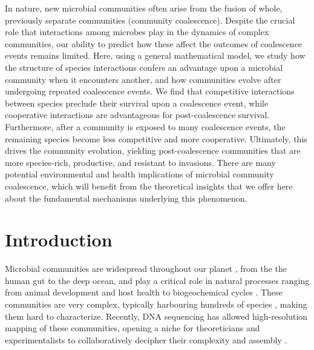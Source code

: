 \documentclass[10pt,letterpaper]{article}
\begin{document}
In nature, new microbial communities often arise from the fusion of whole, previously separate communities (community coalescence). Despite the crucial role that interactions among microbes play in the dynamics of complex communities, our ability to predict how these affect the outcomes of coalescence events remains limited. Here, using a general mathematical model, we study how the structure of species interactions confers an advantage upon a microbial community when it encounters another, and how communities evolve after undergoing repeated coalescence events. We find that competitive interactions between species preclude their survival upon a coalescence event, while cooperative interactions are advantageous for post-coalescence survival. Furthermore, after a community is exposed to many coalescence events, the remaining species become less competitive and more cooperative. Ultimately, this drives the community evolution, yielding post-coalescence communities that are more species-rich, productive, and resistant to invasions. There are many potential environmental and health implications of microbial community coalescence, which will benefit from the theoretical insights that we offer here about the fundamental mechanisms underlying this phenomenon.

\linenumbers

\section*{Introduction}

Microbial communities are widespread throughout our planet \cite{Fierer2006}, from the the human gut to the deep ocean, and play a critical role in natural processes ranging from animal development and host health \cite{Huttenhower2012, McFall-Ngai2013} to biogeochemical cycles \cite{Falkowski2008}. These communities are very complex, typically harbouring hundreds of species \cite{Gilbert2014}, making them hard to characterize. Recently, DNA sequencing has allowed high-resolution mapping of these communities, opening a niche for theoreticians and experimentalists to collaboratively decipher their complexity and assembly \cite{Costello2012,Friedman2017,Goldford2018,Goyal2018,Marsland2019,Vila2019,Coyte2021}.
\end{document}
